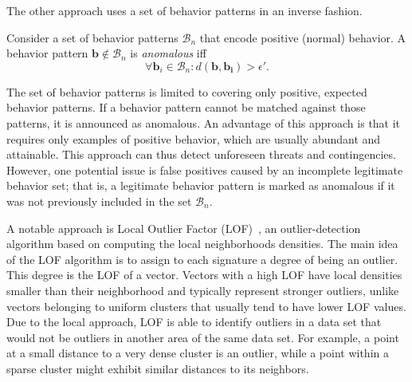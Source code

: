 The other approach uses a set of behavior patterns in an inverse fashion.
\begin{definition}
	Consider a set of behavior patterns $\mathcal{B}_n$ that encode positive (normal) behavior. A behavior pattern $\mathbf{b} \not \in \mathcal{B}_n$ is \emph{anomalous} iff
	$$
	\forall \mathbf{b}_i \in \mathcal{B}_n:  d(\mathbf{b}, \mathbf{b_i}) > \epsilon'.
	$$
\end{definition}
\noindent
The set of behavior patterns is limited to covering only positive, expected behavior patterns. If a behavior pattern cannot be matched against those patterns, it is announced as anomalous. An advantage of this approach is that it requires only examples of positive behavior, which are usually abundant and attainable. This approach can thus detect unforeseen threats and contingencies. However, one potential issue is false positives caused by an incomplete legitimate behavior set; that is, a legitimate behavior pattern is marked as anomalous if it was not previously included in the set $\mathcal{B}_n$. 


A notable approach is Local Outlier Factor (LOF)~\citep{Breunig00lof}, an outlier-detection algorithm based on computing the local neighborhoods densities. The main idea of the LOF algorithm is to assign to each signature a degree of being an outlier. This degree is the LOF of a vector. Vectors with a high LOF have local densities smaller than their neighborhood and typically represent stronger outliers, unlike vectors belonging to uniform clusters that usually tend to have lower LOF values. 
Due to the local approach, LOF is able to identify outliers in a data set that would not be outliers in another area of the same data set. For example, a point at a small distance to a very dense cluster is an outlier, while a point within a sparse cluster might exhibit similar distances to its neighbors.

